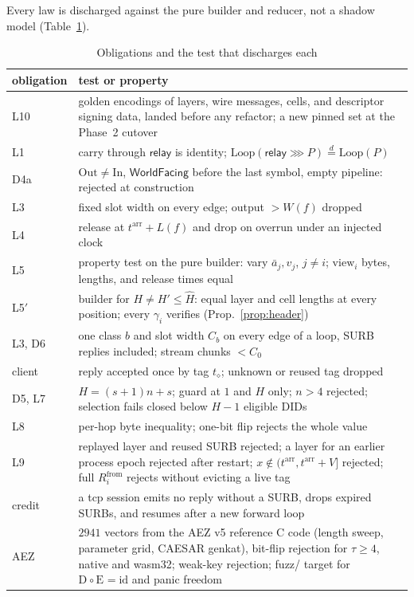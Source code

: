\documentclass[journal]{IEEEtran}
\newcommand{\then}{\mathbin{\ggg}}
\newcommand{\relay}{\mathsf{relay}}
\newcommand{\WF}{\mathsf{WorldFacing}}
\newcommand{\cl}{\diamond}
\newcommand{\Enc}[2]{\mathrm{E}^{#1}_{#2}}
\newcommand{\Dec}[2]{\mathrm{D}^{#1}_{#2}}
\newcommand{\view}{\mathrm{view}}
\newcommand{\frm}{\mathrm{from}}
\newcommand{\LoopOf}{\mathrm{Loop}}
\newcommand{\In}{\mathrm{In}}
\newcommand{\Out}{\mathrm{Out}}
\newcommand{\arr}{t^{\mathrm{arr}}}
\newcommand{\eqd}{\overset{d}{=}}
\newcommand{\Hm}{\hat H}
\DeclareRobustCommand{\code}[1]{{\ttfamily\renewcommand{\_}{\textunderscore\allowbreak}#1}}
\begin{document}
Every law is discharged against the pure builder and reducer, not a shadow
model (Table~\ref{tab:obligations}).

\begin{table}[t]
\caption{Obligations and the test that discharges each}
\label{tab:obligations}
\centering\small
\begin{tabular}{@{}>{\raggedright\arraybackslash}p{}>{\raggedright\arraybackslash}p{}@{}}
\toprule
obligation & test or property \\
\midrule
L10 & golden encodings of layers, wire messages, cells, and descriptor signing data, landed before any refactor; a new pinned set at the Phase~2 cutover \\
L1 & carry through $\relay$ is identity; $\LoopOf(\relay\then P)\eqd\LoopOf(P)$ \\
D4a & $\Out\ne\In$, $\WF$ before the last symbol, empty pipeline: rejected at construction \\
L3 & fixed slot width on every edge; output $>W(f)$ dropped \\
L4 & release at $\arr+L(f)$ and drop on overrun under an injected clock \\
L5 & property test on the pure builder: vary $\bar a_j,v_j$, $j\ne i$; $\view_i$ bytes, lengths, and release times equal \\
L5$'$ & builder for $H\ne H'\le\Hm$: equal layer and cell lengths at every position; every $\gamma_i$ verifies (Prop.~\ref{prop:header}) \\
L3, D6 & one class $b$ and slot width $C_b$ on every edge of a loop, SURB replies included; stream chunks $<C_0$ \\
client & reply accepted once by tag $t_\cl$; unknown or reused tag dropped \\
D5, L7 & $H=(s+1)n+s$; guard at $1$ and $H$ only; $n>4$ rejected; selection fails closed below $H-1$ eligible DIDs \\
L8 & per-hop byte inequality; one-bit flip rejects the whole value \\
L9 & replayed layer and reused SURB rejected; a layer for an earlier process epoch rejected after restart; $x\notin(\arr,\arr+V]$ rejected; full $R_i^{\frm}$ rejects without evicting a live tag \\
credit & a \code{tcp} session emits no reply without a SURB, drops expired SURBs, and resumes after a new forward loop \\
AEZ & $2941$ vectors from the AEZ v5 reference C code (length sweep, parameter grid, CAESAR genkat), bit-flip rejection for $\tau\ge4$, native and \code{wasm32}; weak-key rejection; \code{fuzz/} target for $\Dec{}{}\circ\Enc{}{}=\mathrm{id}$ and panic freedom \\
\bottomrule
\end{tabular}
\end{table}
\end{document}
